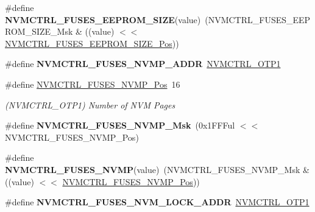 \begin{DoxyCompactItemize}
\item 
\hypertarget{group__fuses__api_ga646501eee0f33491dd39c0a67ab7e933}{}\#define {\bfseries N\+V\+M\+C\+T\+R\+L\+\_\+\+F\+U\+S\+E\+S\+\_\+\+E\+E\+P\+R\+O\+M\+\_\+\+S\+I\+Z\+E}(value)~(N\+V\+M\+C\+T\+R\+L\+\_\+\+F\+U\+S\+E\+S\+\_\+\+E\+E\+P\+R\+O\+M\+\_\+\+S\+I\+Z\+E\+\_\+\+Msk \& ((value) $<$$<$ \hyperlink{group__fuses__api_gad4d1aae7645f998f9be29556ae21136b}{N\+V\+M\+C\+T\+R\+L\+\_\+\+F\+U\+S\+E\+S\+\_\+\+E\+E\+P\+R\+O\+M\+\_\+\+S\+I\+Z\+E\+\_\+\+Pos}))\label{group__fuses__api_ga646501eee0f33491dd39c0a67ab7e933}

\item 
\hypertarget{group__fuses__api_gab463c1bc180f79dbedd44d8bddbad895}{}\#define {\bfseries N\+V\+M\+C\+T\+R\+L\+\_\+\+F\+U\+S\+E\+S\+\_\+\+N\+V\+M\+P\+\_\+\+A\+D\+D\+R}~\hyperlink{group___s_a_m_l21_j18_a__base_ga6ebf76a96eae94342ff79fce4311baf3}{N\+V\+M\+C\+T\+R\+L\+\_\+\+O\+T\+P1}\label{group__fuses__api_gab463c1bc180f79dbedd44d8bddbad895}

\item 
\hypertarget{group__fuses__api_ga84b390f298c352468c8c28b2f808f3e2}{}\#define \hyperlink{group__fuses__api_ga84b390f298c352468c8c28b2f808f3e2}{N\+V\+M\+C\+T\+R\+L\+\_\+\+F\+U\+S\+E\+S\+\_\+\+N\+V\+M\+P\+\_\+\+Pos}~16\label{group__fuses__api_ga84b390f298c352468c8c28b2f808f3e2}

\begin{DoxyCompactList}\small\item\em (N\+V\+M\+C\+T\+R\+L\+\_\+\+O\+T\+P1) Number of N\+V\+M Pages \end{DoxyCompactList}\item 
\hypertarget{group__fuses__api_ga07ea0f71fba3f0fdd28503bc4ed46a27}{}\#define {\bfseries N\+V\+M\+C\+T\+R\+L\+\_\+\+F\+U\+S\+E\+S\+\_\+\+N\+V\+M\+P\+\_\+\+Msk}~(0x1\+F\+F\+Ful $<$$<$ N\+V\+M\+C\+T\+R\+L\+\_\+\+F\+U\+S\+E\+S\+\_\+\+N\+V\+M\+P\+\_\+\+Pos)\label{group__fuses__api_ga07ea0f71fba3f0fdd28503bc4ed46a27}

\item 
\hypertarget{group__fuses__api_ga76a79f06e6c611fcac1769e52c6366cf}{}\#define {\bfseries N\+V\+M\+C\+T\+R\+L\+\_\+\+F\+U\+S\+E\+S\+\_\+\+N\+V\+M\+P}(value)~(N\+V\+M\+C\+T\+R\+L\+\_\+\+F\+U\+S\+E\+S\+\_\+\+N\+V\+M\+P\+\_\+\+Msk \& ((value) $<$$<$ \hyperlink{group__fuses__api_ga84b390f298c352468c8c28b2f808f3e2}{N\+V\+M\+C\+T\+R\+L\+\_\+\+F\+U\+S\+E\+S\+\_\+\+N\+V\+M\+P\+\_\+\+Pos}))\label{group__fuses__api_ga76a79f06e6c611fcac1769e52c6366cf}

\item 
\hypertarget{group__fuses__api_ga84c90d310e0f0ea70df85c5b69ab7403}{}\#define {\bfseries N\+V\+M\+C\+T\+R\+L\+\_\+\+F\+U\+S\+E\+S\+\_\+\+N\+V\+M\+\_\+\+L\+O\+C\+K\+\_\+\+A\+D\+D\+R}~\hyperlink{group___s_a_m_l21_j18_a__base_ga6ebf76a96eae94342ff79fce4311baf3}{N\+V\+M\+C\+T\+R\+L\+\_\+\+O\+T\+P1}\label{group__fuses__api_ga84c90d310e0f0ea70df85c5b69ab7403}


\end{DoxyCompactItemize}
